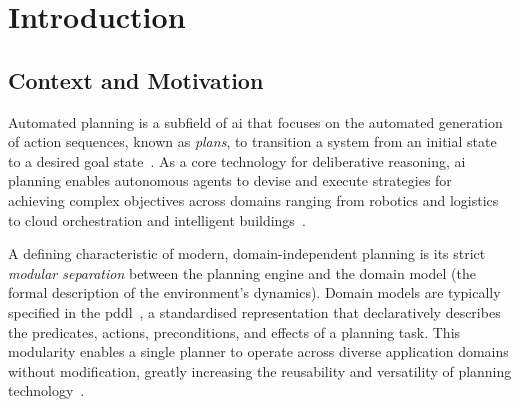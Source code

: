 
\chapter{Introduction}\label{ch:introduction}

\section{Context and Motivation}
\label{sec:intro:context}

Automated planning is a subfield of \gls{ai} that focuses on the automated generation of action sequences, known as \emph{plans}, to transition a system from an initial state to a desired goal state~\cite{GhallabNauTraverso2004, RussellNorvig2021}.
As a core technology for deliberative reasoning, \gls{ai} planning enables autonomous agents to devise and execute strategies for achieving complex objectives across domains ranging from robotics and logistics to cloud orchestration and intelligent buildings~\cite{GhallabNauTraverso2004}.

A defining characteristic of modern, domain-independent planning is its strict \emph{modular separation} between the planning engine and the domain model (the formal description of the environment's dynamics).
Domain models are typically specified in the \gls{pddl}~\cite{McDermott1998}, a standardised representation that declaratively describes the predicates, actions, preconditions, and effects of a planning task.
This modularity enables a single planner to operate across diverse application domains without modification, greatly increasing the reusability and versatility of planning technology~\cite{McDermott1998}.

